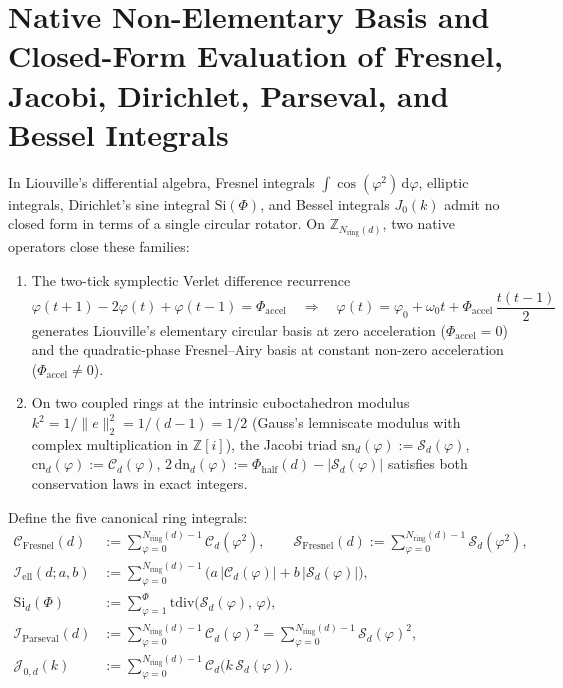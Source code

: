 \documentclass[11pt,a4paper]{article}
\theoremstyle{plain}
\theoremstyle{definition}
\begin{document}
\section{Native Non-Elementary Basis and Closed-Form Evaluation of Fresnel, Jacobi, Dirichlet, Parseval, and Bessel Integrals}
\label{sec:integrals}

In Liouville's differential algebra, Fresnel integrals $\int\cos(\varphi^2)\,\mathrm{d}\varphi$, elliptic integrals, Dirichlet's sine integral $\mathrm{Si}(\Phi)$, and Bessel integrals $J_0(k)$ admit no closed form in terms of a single circular rotator. On $\mathbb{Z}_{N_{\mathrm{ring}}(d)}$, two native operators close these families:
\begin{enumerate}[leftmargin=*,noitemsep]
\item The two-tick symplectic Verlet difference recurrence
  \begin{equation}
    \label{eq:verlet-parabola}
    \varphi(t+1) - 2\varphi(t) + \varphi(t-1) = \Phi_{\mathrm{accel}}
    \quad\Longrightarrow\quad
    \varphi(t) = \varphi_0 + \omega_0 t + \Phi_{\mathrm{accel}}\,\frac{t(t-1)}{2}
  \end{equation}
  generates Liouville's elementary circular basis at zero acceleration ($\Phi_{\mathrm{accel}}=0$) and the quadratic-phase Fresnel--Airy basis at constant non-zero acceleration ($\Phi_{\mathrm{accel}}\ne 0$).
\item On two coupled rings at the intrinsic cuboctahedron modulus $k^2 = 1/\|e\|_2^2 = 1/(d-1) = 1/2$ (Gauss's lemniscate modulus with complex multiplication in $\mathbb{Z}[i]$), the Jacobi triad $\mathrm{sn}_d(\varphi):=\mathcal{S}_d(\varphi)$, $\mathrm{cn}_d(\varphi):=\mathcal{C}_d(\varphi)$, $2\,\mathrm{dn}_d(\varphi):=\Phi_{\mathrm{half}}(d)-|\mathcal{S}_d(\varphi)|$ satisfies both conservation laws in exact integers.
\end{enumerate}

Define the five canonical ring integrals:
\begin{align}
  \mathcal{C}_{\mathrm{Fresnel}}(d) &:= \sum_{\varphi=0}^{N_{\mathrm{ring}}(d)-1}\mathcal{C}_d(\varphi^2),\qquad
  \mathcal{S}_{\mathrm{Fresnel}}(d) := \sum_{\varphi=0}^{N_{\mathrm{ring}}(d)-1}\mathcal{S}_d(\varphi^2), \label{eq:def-fresnel}\\
  \mathcal{I}_{\mathrm{ell}}(d;a,b) &:= \sum_{\varphi=0}^{N_{\mathrm{ring}}(d)-1}\bigl(a\,|\mathcal{C}_d(\varphi)| + b\,|\mathcal{S}_d(\varphi)|\bigr), \label{eq:def-elliptic}\\
  \mathrm{Si}_d(\Phi) &:= \sum_{\varphi=1}^{\Phi}\mathrm{tdiv}\bigl(\mathcal{S}_d(\varphi),\,\varphi\bigr), \label{eq:def-dirichlet}\\
  \mathcal{I}_{\mathrm{Parseval}}(d) &:= \sum_{\varphi=0}^{N_{\mathrm{ring}}(d)-1}\mathcal{C}_d(\varphi)^2 = \sum_{\varphi=0}^{N_{\mathrm{ring}}(d)-1}\mathcal{S}_d(\varphi)^2, \label{eq:def-parseval}\\
  \mathcal{J}_{0,d}(k) &:= \sum_{\varphi=0}^{N_{\mathrm{ring}}(d)-1}\mathcal{C}_d\bigl(k\,\mathcal{S}_d(\varphi)\bigr). \label{eq:def-bessel}
\end{align}
\end{document}

